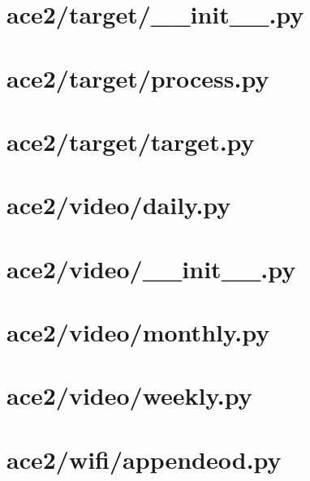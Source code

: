 \documentclass{article}
\begin{document}
\section*{ace2/target/\_\_init\_\_.py}


\section*{ace2/target/process.py}


\section*{ace2/target/target.py}


\section*{ace2/video/daily.py}


\section*{ace2/video/\_\_init\_\_.py}


\section*{ace2/video/monthly.py}


\section*{ace2/video/weekly.py}


\section*{ace2/wifi/appendeod.py}

\end{document}
